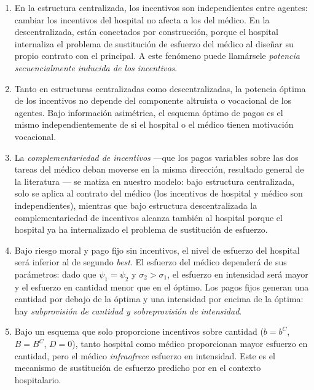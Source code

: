 \begin{enumerate}[label=(\roman*)]
  \item En la estructura centralizada, los incentivos son independientes entre agentes: cambiar los incentivos del hospital no afecta a los del médico. En la descentralizada, están conectados por construcción, porque el hospital internaliza el problema de sustitución de esfuerzo del médico al diseñar su propio contrato con el principal. A este fenómeno puede llamársele \textit{potencia secuencialmente inducida de los incentivos}.

  \item Tanto en estructuras centralizadas como descentralizadas, la potencia óptima de los incentivos no depende del componente altruista o vocacional de los agentes. Bajo información asimétrica, el esquema óptimo de pagos es el mismo independientemente de si el hospital o el médico tienen motivación vocacional.

  \item La \textit{complementariedad de incentivos} ---que los pagos variables sobre las dos tareas del médico deban moverse en la misma dirección, resultado general de la literatura \citep[p.\ 222]{bolton2005}--- se matiza en nuestro modelo: bajo estructura centralizada, solo se aplica al contrato del médico (los incentivos de hospital y médico son independientes), mientras que bajo estructura descentralizada la complementariedad de incentivos alcanza también al hospital porque el hospital ya ha internalizado el problema de sustitución de esfuerzo.

  \item Bajo riesgo moral y pago fijo sin incentivos, el nivel de esfuerzo del hospital será inferior al de segundo \textit{best}. El esfuerzo del médico dependerá de sus parámetros: dado que $\psi_1=\psi_2$ y $\sigma_2>\sigma_1$, el esfuerzo en intensidad será mayor y el esfuerzo en cantidad menor que en el óptimo. Los pagos fijos generan una cantidad por debajo de la óptima y una intensidad por encima de la óptima: hay \textit{subprovisión de cantidad y sobreprovisión de intensidad}.

  \item Bajo un esquema que solo proporcione incentivos sobre cantidad ($b=b^C$, $B=B^C$, $D=0$), tanto hospital como médico proporcionan mayor esfuerzo en cantidad, pero el médico \textit{infraofrece} esfuerzo en intensidad. Este es el mecanismo de sustitución de esfuerzo predicho por \citet{holmstrom1991} en el contexto hospitalario.


\end{enumerate}
